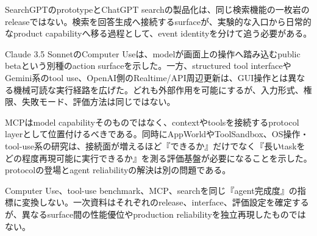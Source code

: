 
SearchGPTのprototypeとChatGPT searchの製品化は、同じ検索機能の一枚岩のreleaseではない。検索を回答生成へ接続するsurfaceが、実験的な入口から日常的なproduct capabilityへ移る過程として、event identityを分けて追う必要がある。\autocite{src-6cafd8cf5668,src-bd5105ccfa25}


Claude 3.5 SonnetのComputer Useは、modelが画面上の操作へ踏み込むpublic betaという別種のaction surfaceを示した。一方、structured tool interfaceやGemini系のtool use、OpenAI側のRealtime/API周辺更新は、GUI操作とは異なる機械可読な実行経路を広げた。どれも外部作用を可能にするが、入力形式、権限、失敗モード、評価方法は同じではない。\autocite{src-9e4ef9c155b6,src-a38408fd5407,src-e283b9c34207,src-ed98251ab05d}


MCPはmodel capabilityそのものではなく、contextやtoolsを接続するprotocol layerとして位置付けるべきである。同時にAppWorldやToolSandbox、OS操作・tool-use系の研究は、接続面が増えるほど『できるか』だけでなく『長いtaskをどの程度再現可能に実行できるか』を測る評価基盤が必要になることを示した。protocolの登場とagent reliabilityの解決は別の問題である。\autocite{src-0d67af76cfef,src-395ebe20f9b0,src-5ad3266ea448,src-7afacff558f5}


\begin{claimboundary}
Computer Use、tool-use benchmark、MCP、searchを同じ『agent完成度』の指標に変換しない。一次資料はそれぞれのrelease、interface、評価設定を確定するが、異なるsurface間の性能優位やproduction reliabilityを独立再現したものではない。\autocite{src-9e4ef9c155b6}
\end{claimboundary}

